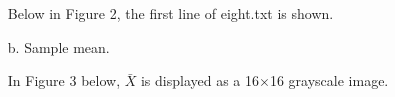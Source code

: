 \documentclass[12pt]{report}
\begin{document}
\begin{enumerate}
  \newpage

  Below in Figure 2, the first line of eight.txt is shown.

  \begin{figure}[H]
    \centering {}
  \end{figure}

  \newpage

\item[b.] Sample mean.

  In Figure 3 below, \( \bar{X}\) is displayed as a 16$\times$16 grayscale
  image.


\end{enumerate}
\end{document}
